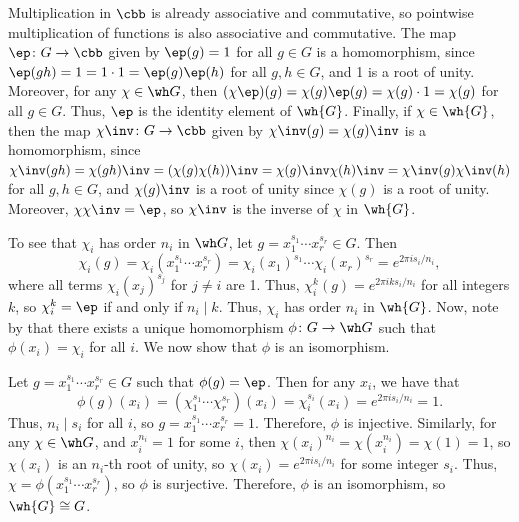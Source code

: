 \begin{solenum}
    \item Multiplication in $\cbb$ is already associative and commutative, so pointwise multiplication of functions is also associative and commutative.
	The map $\ep \colon G \to \cbb$ given by $\ep(g) = 1$ for all $g \in G$ is a homomorphism, since $\ep(gh) = 1 = 1 \cdot 1 = \ep(g)\ep(h)$ for all $g, h \in G$, and 1 is a root of unity.
	Moreover, for any $\chi \in \wh G$, then $(\chi\ep)(g) = \chi(g)\ep(g) = \chi(g) \cdot 1 = \chi(g)$ for all $g \in G$.
	Thus, $\ep$ is the identity element of $\wh{G}$.
	Finally, if $\chi \in \wh{G}$, then the map $\chi\inv \colon G \to \cbb$ given by $\chi\inv(g) = \chi(g)\inv$ is a homomorphism, since $\chi\inv(gh) = \chi(gh)\inv = (\chi(g)\chi(h))\inv = \chi(g)\inv\chi(h)\inv = \chi\inv(g)\chi\inv(h)$ for all $g, h \in G$, and $\chi(g)\inv$ is a root of unity since $\chi(g)$ is a root of unity.
	Moreover, $\chi\chi\inv = \ep$, so $\chi\inv$ is the inverse of $\chi$ in $\wh{G}$.
    \item To see that $\chi_i$ has order $n_i$ in $\wh G$, let $g = x_1^{s_1} \cdots x_r^{s_r} \in G$.
	Then
    \[
    	\chi_i(g) = \chi_i(x_1^{s_1} \cdots x_r^{s_r}) = \chi_i(x_1)^{s_1} \cdots \chi_i(x_r)^{s_r} = e^{2\pi i s_i / n_i},
    \]
    where all terms $\chi_i(x_j)^{s_j}$ for $j \neq i$ are 1.
	Thus, $\chi_i^k(g) = e^{2\pi i k s_i / n_i}$ for all integers $k$, so $\chi_i^k = \ep$ if and only if $n_i \mid k$.
	Thus, $\chi_i$ has order $n_i$ in $\wh{G}$.
	Now, note by  that there exists a unique homomorphism $\phi \colon G \to \wh G$ such that $\phi(x_i) = \chi_i$ for all $i$.
	We now show that $\phi$ is an isomorphism.

    Let $g = x_1^{s_1} \cdots x_r^{s_r} \in G$ such that $\phi(g) = \ep$.
	Then for any $x_i$, we have that
    \[
    	\phi(g)(x_i) = (\chi_1^{s_1} \cdots \chi_r^{s_r})(x_i) = \chi_i^{s_i}(x_i) = e^{2\pi i s_i / n_i} = 1.
    \]
    Thus, $n_i \mid s_i$ for all $i$, so $g = x_1^{s_1} \cdots x_r^{s_r} = 1$.
	Therefore, $\phi$ is injective.
	Similarly, for any $\chi \in \wh G$, and $x_i^{n_i} = 1$ for some $i$, then $\chi(x_i)^{n_i} = \chi(x_i^{n_i}) = \chi(1) = 1$, so $\chi(x_i)$ is an $n_i$-th root of unity, so $\chi(x_i) = e^{2\pi i s_i / n_i}$ for some integer $s_i$.
	Thus, $\chi = \phi(x_1^{s_1} \cdots x_r^{s_r})$, so $\phi$ is surjective.
	Therefore, $\phi$ is an isomorphism, so $\wh{G} \cong G$.
\end{solenum}

